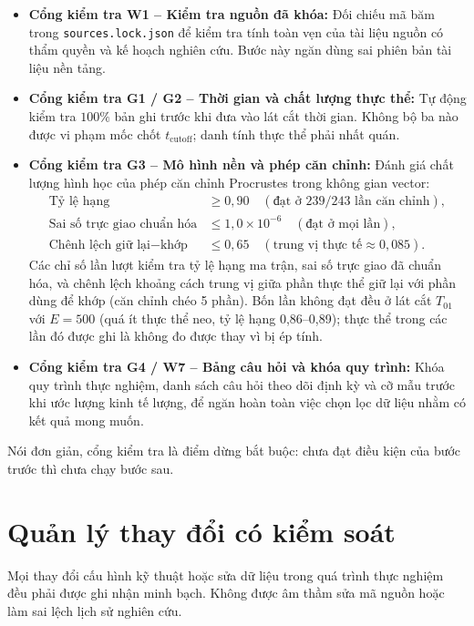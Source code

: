 \begin{itemize}
    \item \textbf{Cổng kiểm tra W1 -- Kiểm tra nguồn đã khóa:} Đối chiếu mã băm trong \texttt{sources.lock.json} để kiểm tra tính toàn vẹn của tài liệu nguồn có thẩm quyền và kế hoạch nghiên cứu. Bước này ngăn dùng sai phiên bản tài liệu nền tảng.
    \item \textbf{Cổng kiểm tra G1 / G2 -- Thời gian và chất lượng thực thể:} Tự động kiểm tra $100\%$ bản ghi trước khi đưa vào lát cắt thời gian. Không bộ ba nào được vi phạm mốc chốt $t_{\text{cutoff}}$; danh tính thực thể phải nhất quán.
    \item \textbf{Cổng kiểm tra G3 -- Mô hình nền và phép căn chỉnh:} Đánh giá chất lượng hình học của phép căn chỉnh Procrustes trong không gian vector:
    \begin{align}
        \text{Tỷ lệ hạng} &\ge 0{,}90 \quad (\text{đạt ở } 239/243 \text{ lần căn chỉnh}), \\
        \text{Sai số trực giao chuẩn hóa} &\le 1{,}0 \times 10^{-6} \quad (\text{đạt ở mọi lần}), \\
        \text{Chênh lệch giữ lại} - \text{khớp} &\le 0{,}65 \quad (\text{trung vị thực tế} \approx 0{,}085).
    \end{align}
    Các chỉ số lần lượt kiểm tra tỷ lệ hạng ma trận, sai số trực giao đã chuẩn hóa, và chênh lệch khoảng cách trung vị giữa phần thực thể giữ lại với phần dùng để khớp (căn chỉnh chéo 5 phần). Bốn lần không đạt đều ở lát cắt $T_{01}$ với $E = 500$ (quá ít thực thể neo, tỷ lệ hạng 0,86--0,89); thực thể trong các lần đó được ghi là không đo được thay vì bị ép tính.
    \item \textbf{Cổng kiểm tra G4 / W7 -- Bảng câu hỏi và khóa quy trình:} Khóa quy trình thực nghiệm, danh sách câu hỏi theo dõi định kỳ và cỡ mẫu trước khi ước lượng kinh tế lượng, để ngăn hoàn toàn việc chọn lọc dữ liệu nhằm có kết quả mong muốn.
\end{itemize}
Nói đơn giản, cổng kiểm tra là điểm dừng bắt buộc: chưa đạt điều kiện của bước trước thì chưa chạy bước sau.
\section{Quản lý thay đổi có kiểm soát}
\label{sec:change_management}

Mọi thay đổi cấu hình kỹ thuật hoặc sửa dữ liệu trong quá trình thực nghiệm đều phải được ghi nhận minh bạch. Không được âm thầm sửa mã nguồn hoặc làm sai lệch lịch sử nghiên cứu.

